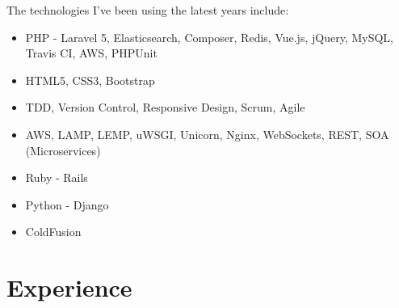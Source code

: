 \documentclass[11pt,a4paper,sans]{moderncv}        %
\begin{document}
\medskip The technologies I've been using the latest years include:
\begin{itemize}
  \item PHP - Laravel 5, Elasticsearch, Composer, Redis, Vue.js, jQuery, MySQL, Travis CI, AWS, PHPUnit
  \item HTML5, CSS3, Bootstrap
  \item TDD, Version Control, Responsive Design, Scrum, Agile
  \item AWS, LAMP, LEMP, uWSGI, Unicorn, Nginx, WebSockets, REST, SOA (Microservices)
  \item Ruby - Rails
  \item Python - Django
  \item ColdFusion
\end{itemize}
\clearpage

\section{Experience}
\end{document}
